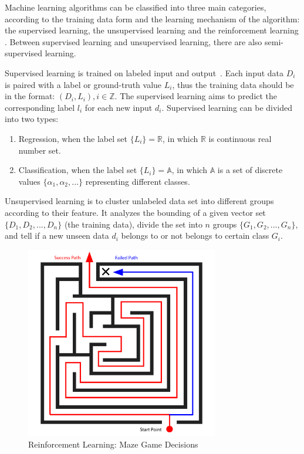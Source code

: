 \begin{spacing}{1.5}
Machine learning algorithms can be classified into three main categories, according to the training data form and the learning mechanism of the algorithm: the supervised learning, the unsupervised learning and the reinforcement learning \cite{mohri2018foundations}. Between supervised learning and unsupervised learning, there are also semi-supervised learning.

Supervised learning is trained on labeled input and output~\cite{sen2020supervised, kotsiantis2007supervised}. Each input data $D_i$ is paired with a label or ground-truth value $L_i$, thus the training data should be in the format: $(D_i, L_i), i \in \mathbb{Z}$. The supervised learning aims to predict the corresponding label $l_i$ for each new input $d_i$. Supervised learning can be divided into two types: 

\begin{enumerate}
    \item Regression, when the label set $\{L_i\} = \mathbb{R}$, in which $\mathbb{R}$ is continuous real number set.
    \item Classification, when the label set $\{L_i\} = \mathbb{A}$, in which $\mathbb{A}$ is a set of discrete values $\{\alpha_1, \alpha_2, ...\}$ representing different classes.
\end{enumerate}

Unsupervised learning is to cluster unlabeled data set into different groups according to their feature\cite{meena2019survey}. It analyzes the bounding of a given vector set $\{D_1, D_2, ...,D_n\}$ (the training data), divide the set into $n$ groups $\{G_1, G_2, ..., G_n\}$, and tell if a new unseen data $d_i$ belongs to or not belongs to certain class $G_i$.

\begin{figure}[ht]
\centering
\includegraphics[width=0.75\textwidth, fbox]{Chapter2/reinforcement.pdf}
\caption{Reinforcement Learning: Maze Game Decisions}
\label{fig:reinforcement} 
\end{figure}


\end{spacing}
